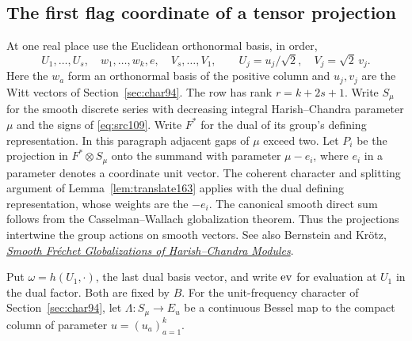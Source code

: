 \documentclass[a4paper,11pt]{article}
\theoremstyle{definition}
\theoremstyle{remark}
\numberwithin{equation}{section}
\begin{document}
\subsection{The first flag coordinate of a tensor projection}\label{nav:V-49}
At one real place use the Euclidean orthonormal basis, in order,
\[
 U_1,\ldots,U_s,\quad w_1,\ldots,w_k,e,\quad V_s,\ldots,V_1 ,
 \qquad U_j=u_j/\sqrt2,\quad V_j=\sqrt2\,v_j .
\]
Here the \(w_a\) form an orthonormal basis of the positive
column and \(u_j,v_j\) are the Witt vectors of Section~\ref{sec:char94}.
The row has rank \(r=k+2s+1\). Write \(S_\mu\) for the smooth
discrete series with decreasing integral Harish--Chandra parameter
\(\mu\) and the signs of \eqref{eq:src109}. Write \(F^*\) for
the dual of its group's defining representation. In this paragraph
adjacent gaps of \(\mu\) exceed two. Let \(P_i\) be the projection
in \(F^*\otimes S_\mu\) onto the summand with parameter
\(\mu-e_i\), where \(e_i\) in a parameter denotes a coordinate
unit vector. The coherent character and splitting argument of
Lemma~\ref{lem:translate163} applies with the dual defining
representation, whose weights are the \(-e_i\). The canonical
smooth direct sum follows from the Casselman--Wallach globalization
theorem. Thus the projections intertwine the group actions
on smooth vectors. See also Bernstein and Krötz,
\href{https://arxiv.org/abs/0812.1684}{\emph{Smooth Fréchet Globalizations of Harish--Chandra Modules}}.

Put \(\omega=h(U_1,\cdot)\), the last dual basis vector, and
write \({\rm ev}\) for evaluation at \(U_1\) in the dual
factor. Both are fixed by \(B\). For the unit-frequency
character of Section~\ref{sec:char94}, let
\(\Lambda:S_\mu\longrightarrow E_u\) be a continuous Bessel
map to the compact column of parameter \(u=(u_a)_{a=1}^k\).
\end{document}
